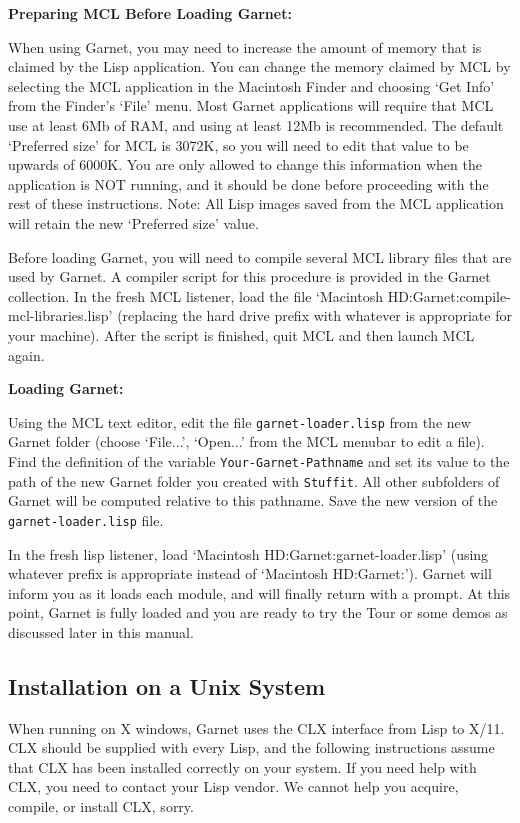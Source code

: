 \documentclass{report}
\begin{document}
{\bf Preparing MCL Before Loading Garnet:}

When using Garnet, you may need to increase the amount of memory that
is claimed by the Lisp application.  You can change the memory claimed
by MCL by selecting the MCL application in the Macintosh Finder and
choosing `Get Info' from the Finder's `File' menu.  Most Garnet
applications will require that MCL use at least 6Mb of RAM, and using
at least 12Mb is recommended.  The default `Preferred size' for MCL is
3072K, so you will need to edit that value to be upwards of 6000K.
You are only allowed to change this information when the application
is NOT running, and it should be done before proceeding with the rest
of these instructions.  Note: All Lisp images saved from the MCL
application will retain the new `Preferred size' value.

Before loading Garnet, you will need to compile several MCL library
files that are used by Garnet.  A compiler script for this procedure
is provided in the Garnet collection.  In the fresh MCL listener, load
the file `Macintosh HD:Garnet:compile-mcl-libraries.lisp' (replacing
the hard drive prefix with whatever is appropriate for your machine).
After the script is finished, quit MCL and then launch MCL again.


{\bf Loading Garnet:}

Using the MCL text editor, edit the file \texttt{garnet-loader.lisp} from
the new Garnet folder (choose `File...', `Open...' from the MCL
menubar to edit a file).  Find the definition of the variable
\texttt{Your-Garnet-Pathname} and set its value to the path of the new
Garnet folder you created with \texttt{Stuffit}.  All other subfolders of
Garnet will be computed relative to this pathname.  Save the new
version of the \texttt{garnet-loader.lisp} file.

In the fresh lisp listener, load `Macintosh
HD:Garnet:garnet-loader.lisp' (using whatever prefix is appropriate
instead of `Macintosh HD:Garnet:').  Garnet will inform you as it
loads each module, and will finally return with a prompt.  At this
point, Garnet is fully loaded and you are ready to try the Tour or
some demos as discussed later in this manual.



\subsection{Installation on a Unix System}

When running on X windows, Garnet uses the CLX interface from Lisp to
X/11.  CLX should be supplied with every Lisp, and the following
instructions assume that CLX has been installed correctly on your
system.  If you need help with CLX, you need to contact your Lisp
vendor.  We cannot help you acquire, compile, or install CLX, sorry.
\end{document}
